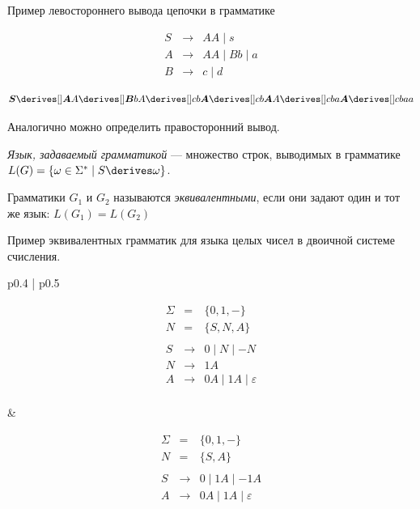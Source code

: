\begin{example}
Пример левостороннего вывода цепочки в грамматике

  \[
    \begin{array}{rcl}
    S& \rightarrow & A A \mid s  \\
    A& \rightarrow & A A \mid B b \mid a \\
    B& \rightarrow & c \mid d
    \end{array}
  \]

  \[ \boldsymbol{S} \derives[] \boldsymbol{A} A \derives[] \boldsymbol{B} b A \derives[] c b \boldsymbol{A} \derives[] c b \boldsymbol{A} A \derives[] c b a \boldsymbol{A} \derives[] c b a a \]
\end{example}

Аналогично можно определить правосторонний вывод.

\begin{definition}
\textit{Язык, задаваемый грамматикой} --- множество строк, выводимых в грамматике $L(G) = \{ \omega \in \Sigma^* \mid S \derives \omega \}$.
\end{definition}

\begin{definition}
  Грамматики $G_1$ и $G_2$ называются \textit{эквивалентными}, если они задают один и тот же язык: $L(G_1) = L(G_2)$
\end{definition}


\begin{example}  Пример эквивалентных грамматик для языка целых чисел в двоичной системе счисления.

  \begin{tabular}{p{} | p{}}

    \[
      \begin{array}{rcl}
      \Sigma &=& \{ 0, 1, - \} \\
      N &=& \{ S, N, A \} \\~\\
      S& \rightarrow & 0 \mid N \mid - N  \\
      N& \rightarrow & 1 A \\
      A& \rightarrow & 0 A \mid 1 A  \mid \varepsilon\\
      \end{array}
    \]

    &

    \[
      \begin{array}{rcl}
      \Sigma &=& \{ 0, 1, - \} \\
      N &=& \{ S, A \} \\~\\
      S& \rightarrow & 0 \mid 1 A  \mid - 1 A  \\
      A& \rightarrow &  0 A \mid 1 A  \mid \varepsilon\\
      \end{array}
    \]
    \end{tabular}

\end{example}


